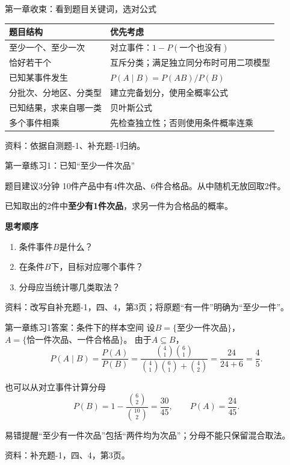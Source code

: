 \documentclass[aspectratio=169,10pt]{beamer}
\newcommand{\source}[1]{\vfill{\color{Muted}\fontsize{6.5}{8}\selectfont 资料：#1\par}}
\newcommand{\warn}[1]{\begin{alertblock}{易错提醒}#1\end{alertblock}}
\begin{document}
\begin{frame}[t]{第一章收束：看到题目关键词，选对公式}
\renewcommand{\arraystretch}{1.45}
\begin{tabular}{p{3.7cm}p{8.9cm}}
\toprule
\textbf{题目结构} & \textbf{优先考虑}\\\midrule
至少一个、至少一次 & 对立事件：$1-P(\text{一个也没有})$\\
恰好若干个 & 互斥分类；满足独立同分布时可用二项模型\\
已知某事件发生 & $P(A\mid B)=P(AB)/P(B)$\\
分批次、分地区、分类型 & 建立完备划分，使用全概率公式\\
已知结果，求来自哪一类 & 贝叶斯公式\\
多个事件相乘 & 先检查独立性；否则使用条件概率连乘\\\bottomrule
\end{tabular}
\source{依据自测题-1、补充题-1归纳。}
\end{frame}

\begin{frame}[t]{第一章练习1：已知“至少一件次品”}
\begin{block}{题目\quad 建议3分钟}
10件产品中有4件次品、6件合格品。从中随机无放回取2件。

已知取出的2件中\textbf{至少有1件次品}，求另一件为合格品的概率。
\end{block}
\vspace{3mm}
\textbf{思考顺序}
\begin{enumerate}
\item 条件事件$B$是什么？
\item 在条件$B$下，目标对应哪个事件？
\item 分母应当统计哪几类取法？
\end{enumerate}
\source{改写自补充题-1，四、4，第3页；将原题“有一件”明确为“至少一件”。}
\end{frame}

\begin{answerframe}{第一章练习1答案：条件下的样本空间}
设$B=\{\text{至少一件次品}\}$，$A=\{\text{恰一件次品、一件合格品}\}$。
由于$A\subseteq B$，
\[
P(A\mid B)=\frac{P(A)}{P(B)}
=\frac{\binom41\binom61}{\binom41\binom61+\binom42}
=\frac{24}{24+6}=\boxed{\frac45}.
\]
\begin{block}{也可以从对立事件计算分母}
\[
P(B)=1-\frac{\binom62}{\binom{10}2}=\frac{30}{45},\qquad P(A)=\frac{24}{45}.
\]
\end{block}
\warn{“至少有一件次品”包括“两件均为次品”；分母不能只保留混合取法。}
\source{补充题-1，四、4，第3页。}
\end{answerframe}
\end{document}
